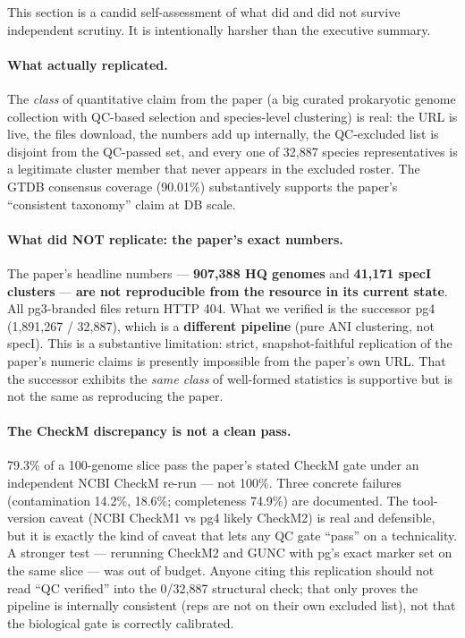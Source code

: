 \documentclass[11pt]{article}
\begin{document}
This section is a candid self-assessment of what did and did not survive
independent scrutiny. It is intentionally harsher than the executive summary.

\paragraph{What actually replicated.}
The \emph{class} of quantitative claim from the paper (a big curated
prokaryotic genome collection with QC-based selection and species-level
clustering) is real: the URL is live, the files download, the numbers add up
internally, the QC-excluded list is disjoint from the QC-passed set, and every
one of 32{,}887 species representatives is a legitimate cluster member that
never appears in the excluded roster. The GTDB consensus coverage (90.01\%)
substantively supports the paper's ``consistent taxonomy'' claim at DB scale.

\paragraph{What did NOT replicate: the paper's exact numbers.}
The paper's headline numbers --- \textbf{907{,}388 HQ genomes} and
\textbf{41{,}171 specI clusters} --- \textbf{are not reproducible from the
resource in its current state}. All pg3-branded files return HTTP 404. What we
verified is the successor pg4 (1{,}891{,}267 / 32{,}887), which is a
\textbf{different pipeline} (pure ANI clustering, not specI). This is a
substantive limitation: strict, snapshot-faithful replication of the paper's
numeric claims is presently impossible from the paper's own URL. That the
successor exhibits the \emph{same class} of well-formed statistics is
supportive but is not the same as reproducing the paper.

\paragraph{The CheckM discrepancy is not a clean pass.}
79.3\% of a 100-genome slice pass the paper's stated CheckM gate under an
independent NCBI CheckM re-run --- not 100\%. Three concrete failures
(contamination 14.2\%, 18.6\%; completeness 74.9\%) are documented. The
tool-version caveat (NCBI CheckM1 vs pg4 likely CheckM2) is real and
defensible, but it is exactly the kind of caveat that lets any QC gate
``pass'' on a technicality. A stronger test --- rerunning CheckM2 and GUNC
with pg's exact marker set on the same slice --- was out of budget. Anyone
citing this replication should not read ``QC verified'' into the 0/32{,}887
structural check; that only proves the pipeline is internally consistent
(reps are not on their own excluded list), not that the biological gate is
correctly calibrated.
\end{document}
